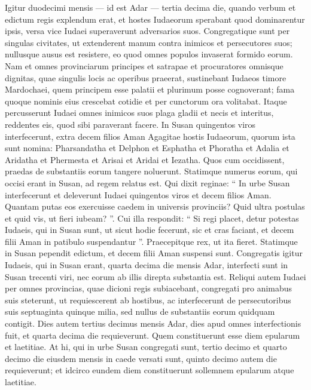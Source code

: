 \begin{biblechapter}
\begin{biblechapter}
\begin{biblechapter}
\begin{biblechapter}
\begin{biblechapter}
\begin{biblechapter}
\begin{biblechapter}
\begin{biblechapter}
\begin{biblechapter}
\verse Igitur duodecimi mensis — id est Adar — tertia decima die, quando verbum et edictum regis explendum erat, et hostes Iudaeorum sperabant quod dominarentur ipsis, versa vice Iudaei superaverunt adversarios suos. 
\verse Congregatique sunt per singulas civitates, ut extenderent manum contra inimicos et persecutores suos; nullusque ausus est resistere, eo quod omnes populos invaserat formido eorum. 
\verse Nam et omnes provinciarum principes et satrapae et procuratores omnisque dignitas, quae singulis locis ac operibus praeerat, sustinebant Iudaeos timore Mardochaei, 
\verse quem principem esse palatii et plurimum posse cognoverant; fama quoque nominis eius crescebat cotidie et per cunctorum ora volitabat.
 \verse Itaque percusserunt Iudaei omnes inimicos suos plaga gladii et necis et interitus, reddentes eis, quod sibi paraverant facere. 
\verse In Susan quingentos viros interfecerunt, extra decem filios Aman Agagitae hostis Iudaeorum, quorum ista sunt nomina: 
\verse Pharsandatha et Delphon et Esphatha 
\verse et Phoratha et Adalia et Aridatha 
\verse et Phermesta et Arisai et Aridai et Iezatha. 
\verse Quos cum occidissent, praedas de substantiis eorum tangere noluerunt.
 \verse Statimque numerus eorum, qui occisi erant in Susan, ad regem relatus est. 
 \verse Qui dixit reginae: “ In urbe Susan interfecerunt et deleverunt Iudaei quingentos viros et decem filios Aman. Quantam putas eos exercuisse caedem in universis provinciis? Quid ultra postulas et quid vis, ut fieri iubeam? ”.
 \verse Cui illa respondit: “ Si regi placet, detur potestas Iudaeis, qui in Susan sunt, ut sicut hodie fecerunt, sic et cras faciant, et decem filii Aman in patibulo suspendantur ”. 
\verse Praecepitque rex, ut ita fieret. Statimque in Susan pependit edictum, et decem filii Aman suspensi sunt. 
\verse Congregatis igitur Iudaeis, qui in Susan erant, quarta decima die mensis Adar, interfecti sunt in Susan trecenti viri, nec eorum ab illis direpta substantia est.
 \verse Reliqui autem Iudaei per omnes provincias, quae dicioni regis subiacebant, congregati pro animabus suis steterunt, ut requiescerent ab hostibus, ac interfecerunt de persecutoribus suis septuaginta quinque milia, sed nullus de substantiis eorum quidquam contigit.
 \verse Dies autem tertius decimus mensis Adar, dies apud omnes interfectionis fuit, et quarta decima die requieverunt. Quem constituerunt esse diem epularum et laetitiae. 
\verse At hi, qui in urbe Susan congregati sunt, tertio decimo et quarto decimo die eiusdem mensis in caede versati sunt, quinto decimo autem die requieverunt; et idcirco eundem diem constituerunt sollemnem epularum atque laetitiae. 

\end{biblechapter}
\end{biblechapter}
\end{biblechapter}
\end{biblechapter}
\end{biblechapter}
\end{biblechapter}
\end{biblechapter}
\end{biblechapter}
\end{biblechapter}
